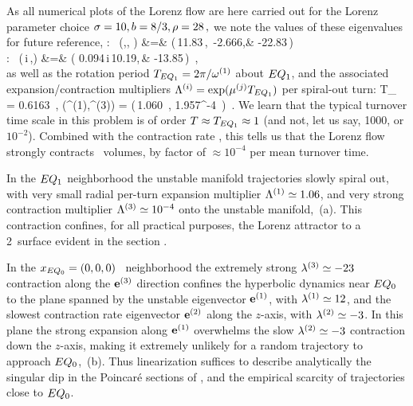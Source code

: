 As all numerical plots of the Lorenz flow are
here carried out for the Lorenz parameter choice
\(
    \sigma = 10, b= 8/3, \rLor = 28
\,,
\)
we note the values of these eigenvalues for future reference,
\beq
{}
:~
(\eigExp[1],\eigExp[2], \eigExp[3])
    &=& (\,11.83\,,~-2.666,& -22.83\,)   \\
:~
(\eigRe[1] \pm\,i\,\eigIm[1],\eigExp[3])
    &=& (\,\,0.094\,\pm i\,10.19,\,& -13.85\,) \,, \\
\earr
\label{EqLorenzStab}
\eeq
as
well as the rotation period
$T_{\EQV{1}} = 2\pi/\eigIm[1]$ about $\EQV{1}$,
and the  associated expansion/contraction multipliers
$\ExpaEig^{(i)} = \exp(\eigRe[j] T_{\EQV{1}})$
per spiral-out turn:
\beq
T_{} =  0.6163 \,, \qquad
(\ExpaEig^{(1)},\ExpaEig^{(3)})
   = (\,1.060 \,, 1.957^{-4} \,)
\,.
\label{EqLorenzMltp}
\eeq
We learn that the typical turnover time scale in this problem is
of order $T \approx T_{\EQV{1}} \approx 1$
(and not, let us say, 1000, or $10^{-2}$). Combined with
the contraction rate , this tells us that
the Lorenz flow strongly contracts \statesp\ volumes, by factor of
$ \approx 10^{-4}$ per mean turnover time.

In the $\EQV{1}$ neighborhood the unstable manifold
trajectories slowly spiral out, with
very small radial  per-turn expansion multiplier
$\ExpaEig^{(1)} \simeq  1.06$,
and very strong contraction multiplier
$\ExpaEig^{(3)}  \simeq 10^{-4}$
onto the unstable manifold,
\,(a).
This contraction confines, for all practical purposes,
the Lorenz attractor to a 2\dmn\ surface
evident in the section .


In the $\ssp_{\EQV{0}} = (0,0,0)$ \eqv\ neighborhood the extremely strong
$\eigExp[3] \simeq -23$ contraction along the $\jEigvec[3]$ direction
confines the hyperbolic dynamics near $\EQV{0}$ to the plane
spanned by the unstable eigen\-vector $\jEigvec[1]$,
with $\eigExp[1] \simeq 12$, and
the slowest contraction rate eigen\-vector $\jEigvec[2]$
along the $z$-axis, with $\eigExp[2] \simeq - 3$.
In this plane the strong expansion %
along $\jEigvec[1]$ overwhelms the
slow  $\eigExp[2] \simeq - 3$ contraction down the $z$-axis,
making it extremely unlikely for a random trajectory
to approach $\EQV{0}$, \,(b).
Thus linearization suffices to describe analytically the singular
dip in the Poincar\'e sections of
, and the empirical scarcity
of trajectories close to $\EQV{0}$.

